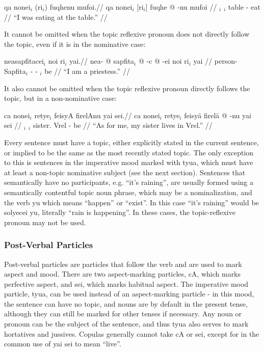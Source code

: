 \documentclass{article}
\begin{document}
\ex[lingstyle=QuCheanya] \begingl
\glpreamble qa nonei$_i$ (ri$_i$) fuqhenu mufoi.//
\gla qa nonei$_i$ [ri$_i$] fuqhe @ -nu mufoi //
\glb {} $_i$ $_i$ table - eat //
\glft ``I was eating at the table.'' //
\endgl \xe

It cannot be omitted when the topic reflexive pronoun does not directly follow the topic, even if it is in the nominative case:

\ex[lingstyle=QuCheanya] \begingl
\glpreamble neasapfitacei$_i$ noi ri$_i$ yai.//
\gla nea- @ sapfita$_i$ @ -c @ -ei noi ri$_i$ yai //
\glb person- Sapfita$_i$ - -  $_i$ be //
\glft ``I am a priestess.'' //
\endgl \xe

It also cannot be omitted when the topic reflexive pronoun directly follows the topic, but in a non-nominative case:

\ex[lingstyle=QuCheanya] \begingl
\glpreamble ca nonei$_i$ retye$_i$ feisyA firelAnu yai sei.//
\gla ca nonei$_i$ retye$_i$ feisy\"a firel\"a @ -nu yai sei //
\glb {} $_i$ $_i$ sister. Vrel - be  //
\glft ``As for me, my sister lives in Vrel.'' //
\endgl \xe

Every sentence must have a topic, either explicitly stated in the current sentence, or implied to be the same as the most recently stated topic.  The only exception to this is sentences in the imperative mood marked with {\quch tyua}, which must have at least a non-topic nominative subject (see the next section).  Sentences that semantically have no participants, e.g. ``it's raining'', are usually formed using a semantically contentful topic noun phrase, which may be a nominalization, and the verb {\quch yu} which means ``happen'' or ``exist''.  In this case ``it's raining'' would be {\quch solyecei yu}, literally ``rain is happening''.  In these cases, the topic-reflexive pronoun may not be used.

\subsubsection{Post-Verbal Particles}
\label{postverbalparts}

Post-verbal particles are particles that follow the verb and are used to mark aspect and mood.  There are two aspect-marking particles, {\quch cA}, which marks perfective aspect, and {\quch sei}, which marks habitual aspect.  The imperative mood particle, {\quch tyua}, can be used instead of an aspect-marking particle - in this mood, the sentence can have no topic, and nouns are by default in the present tense, although they can still be marked for other tenses if necessary.  Any noun or pronoun can be the subject of the sentence, and thus {\quch tyua} also serves to mark hortatives and jussives.  Copulas generally cannot take {\quch cA} or {\quch sei}, except for in the common use of {\quch yai sei} to mean ``live''.
\end{document}
